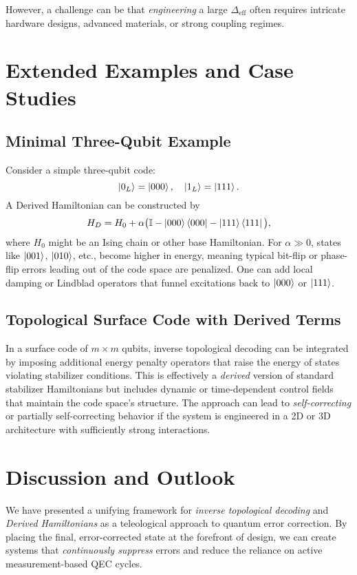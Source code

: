 \documentclass[11pt]{article}
\begin{document}
However, a challenge can be that \emph{engineering} a large $\Delta_{\mathrm{eff}}$ often requires intricate hardware designs, advanced materials, or strong coupling regimes.

\section{Extended Examples and Case Studies}
\label{sec:case-studies}

\subsection{Minimal Three-Qubit Example}
Consider a simple three-qubit code:
\[
\ket{0_L} = \ket{000}, \quad
\ket{1_L} = \ket{111}.
\]
A Derived Hamiltonian can be constructed by
\begin{equation}
    H_D = H_0 + \alpha \big(\mathbb{I} - \ket{000}\bra{000} - \ket{111}\bra{111}\big),
\end{equation}
where $H_0$ might be an Ising chain or other base Hamiltonian. For $\alpha \gg 0$, states like $\ket{001}$, $\ket{010}$, etc., become higher in energy, meaning typical bit-flip or phase-flip errors leading out of the code space are penalized. One can add local damping or Lindblad operators that funnel excitations back to $\ket{000}$ or $\ket{111}$.

\subsection{Topological Surface Code with Derived Terms}
In a surface code of $m \times m$ qubits, inverse topological decoding can be integrated by imposing additional energy penalty operators that raise the energy of states violating stabilizer conditions. This is effectively a \emph{derived} version of standard stabilizer Hamiltonians but includes dynamic or time-dependent control fields that maintain the code space's structure. The approach can lead to \emph{self-correcting} or partially self-correcting behavior if the system is engineered in a 2D or 3D architecture with sufficiently strong interactions.

\section{Discussion and Outlook}
\label{sec:discussion}

We have presented a unifying framework for \emph{inverse topological decoding} and \emph{Derived Hamiltonians} as a teleological approach to quantum error correction. By placing the final, error-corrected state at the forefront of design, we can create systems that \emph{continuously suppress} errors and reduce the reliance on active measurement-based QEC cycles.
\end{document}
